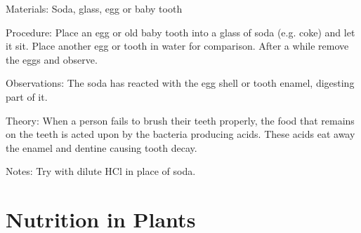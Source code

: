 \begin{multicols}{2}
\begin{description*}
\item[Materials:]{Soda, glass, egg or baby tooth}
\item[Procedure:]{Place an egg or old baby tooth into a glass of soda (e.g. coke) and let it sit. Place another egg or tooth in water for comparison. After a while remove the eggs and observe.}
\item[Observations:]{The soda has reacted with the egg shell or tooth enamel, digesting part of it.}
\item[Theory:]{When a person fails to brush their teeth properly, the food that remains on the teeth is acted
upon by the bacteria producing acids. These acids eat away the enamel and dentine causing
tooth decay.}
\item[Notes:]{Try with dilute HCl in place of soda.}
\end{description*}

%
%


\section*{Nutrition in Plants} 



\end{multicols}
